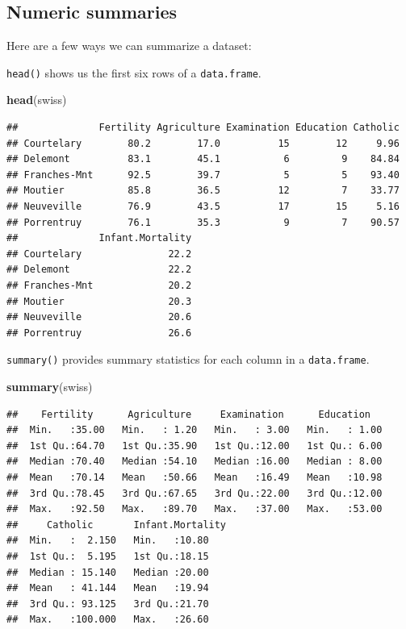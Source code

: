 \documentclass[]{book}
\newenvironment{Shaded}{\begin{snugshade}}{\end{snugshade}}
\newcommand{\KeywordTok}[1]{\textcolor[rgb]{0.13,0.29,0.53}{\textbf{{#1}}}}
\newcommand{\NormalTok}[1]{{#1}}
\theoremstyle{definition}
\theoremstyle{definition}
\theoremstyle{remark}
\begin{document}
\subsection{Numeric summaries}\label{numeric-summaries}

Here are a few ways we can summarize a dataset:

\texttt{head()} shows us the first six rows of a \texttt{data.frame}.

\begin{Shaded}
\begin{Highlighting}[]
\KeywordTok{head}\NormalTok{(swiss)}
\end{Highlighting}
\end{Shaded}

\begin{verbatim}
##              Fertility Agriculture Examination Education Catholic
## Courtelary        80.2        17.0          15        12     9.96
## Delemont          83.1        45.1           6         9    84.84
## Franches-Mnt      92.5        39.7           5         5    93.40
## Moutier           85.8        36.5          12         7    33.77
## Neuveville        76.9        43.5          17        15     5.16
## Porrentruy        76.1        35.3           9         7    90.57
##              Infant.Mortality
## Courtelary               22.2
## Delemont                 22.2
## Franches-Mnt             20.2
## Moutier                  20.3
## Neuveville               20.6
## Porrentruy               26.6
\end{verbatim}

\texttt{summary()} provides summary statistics for each column in a
\texttt{data.frame}.

\begin{Shaded}
\begin{Highlighting}[]
\KeywordTok{summary}\NormalTok{(swiss)}
\end{Highlighting}
\end{Shaded}

\begin{verbatim}
##    Fertility      Agriculture     Examination      Education    
##  Min.   :35.00   Min.   : 1.20   Min.   : 3.00   Min.   : 1.00  
##  1st Qu.:64.70   1st Qu.:35.90   1st Qu.:12.00   1st Qu.: 6.00  
##  Median :70.40   Median :54.10   Median :16.00   Median : 8.00  
##  Mean   :70.14   Mean   :50.66   Mean   :16.49   Mean   :10.98  
##  3rd Qu.:78.45   3rd Qu.:67.65   3rd Qu.:22.00   3rd Qu.:12.00  
##  Max.   :92.50   Max.   :89.70   Max.   :37.00   Max.   :53.00  
##     Catholic       Infant.Mortality
##  Min.   :  2.150   Min.   :10.80   
##  1st Qu.:  5.195   1st Qu.:18.15   
##  Median : 15.140   Median :20.00   
##  Mean   : 41.144   Mean   :19.94   
##  3rd Qu.: 93.125   3rd Qu.:21.70   
##  Max.   :100.000   Max.   :26.60
\end{verbatim}
\end{document}
